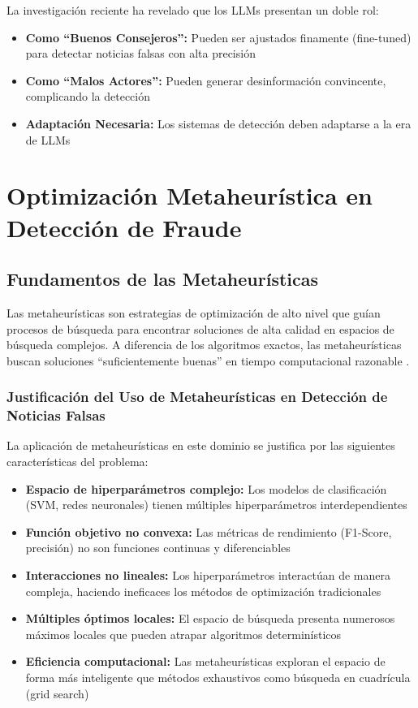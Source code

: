 La investigación reciente ha revelado que los LLMs presentan un doble rol:
\begin{itemize}
    \item \textbf{Como ``Buenos Consejeros'':} Pueden ser ajustados finamente (fine-tuned) para detectar noticias falsas con alta precisión \cite{hu2024bad}
    \item \textbf{Como ``Malos Actores'':} Pueden generar desinformación convincente, complicando la detección \cite{su2023fake}
    \item \textbf{Adaptación Necesaria:} Los sistemas de detección deben adaptarse a la era de LLMs \cite{su2023adapting}
\end{itemize}

\section{Optimización Metaheurística en Detección de Fraude}
\label{sec:optimizacion_metaheuristica}

\subsection{Fundamentos de las Metaheurísticas}

Las metaheurísticas son estrategias de optimización de alto nivel que guían procesos de búsqueda para encontrar soluciones de alta calidad en espacios de búsqueda complejos. A diferencia de los algoritmos exactos, las metaheurísticas buscan soluciones ``suficientemente buenas'' en tiempo computacional razonable \cite{anselmo2013diseno}.

\subsubsection{Justificación del Uso de Metaheurísticas en Detección de Noticias Falsas}

La aplicación de metaheurísticas en este dominio se justifica por las siguientes características del problema:

\begin{itemize}
    \item \textbf{Espacio de hiperparámetros complejo:} Los modelos de clasificación (SVM, redes neuronales) tienen múltiples hiperparámetros interdependientes
    \item \textbf{Función objetivo no convexa:} Las métricas de rendimiento (F1-Score, precisión) no son funciones continuas y diferenciables
    \item \textbf{Interacciones no lineales:} Los hiperparámetros interactúan de manera compleja, haciendo ineficaces los métodos de optimización tradicionales
    \item \textbf{Múltiples óptimos locales:} El espacio de búsqueda presenta numerosos máximos locales que pueden atrapar algoritmos determinísticos
    \item \textbf{Eficiencia computacional:} Las metaheurísticas exploran el espacio de forma más inteligente que métodos exhaustivos como búsqueda en cuadrícula (grid search)
\end{itemize}

